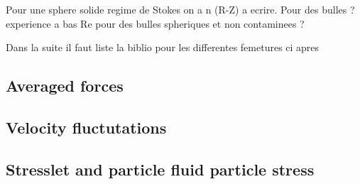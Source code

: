 Pour une sphere solide regime de Stokes on a n (R-Z) a ecrire. Pour des bulles ? experience a bas Re pour des bulles spheriques et non contaminees ?


Dans la suite il faut liste la biblio pour les differentes femetures ci apres
\subsection{Averaged forces}

\subsection{Velocity fluctutations}

\subsection{Stresslet and particle fluid particle stress}









